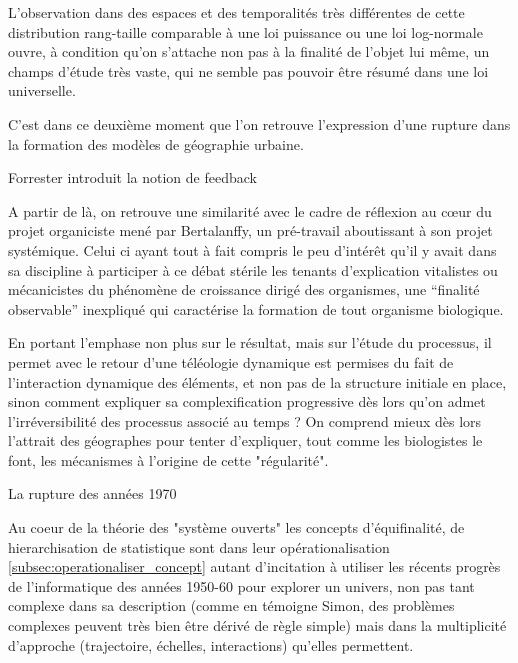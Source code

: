 { 





L'observation dans des espaces et des temporalités très différentes \autocite{Pumain1997} de cette distribution rang-taille comparable à une loi puissance ou une loi log-normale ouvre, à condition qu'on s'attache non pas à la finalité de l'objet lui même, un champs d'étude très vaste, qui ne semble pas pouvoir être résumé dans une loi universelle.



C'est dans ce deuxième moment que l'on retrouve l'expression d'une rupture dans la formation des modèles de géographie urbaine.

Forrester introduit la notion de feedback

A partir de là, on retrouve une similarité avec le cadre de réflexion au cœur du projet organiciste mené par Bertalanffy, un pré-travail aboutissant à son projet systémique. Celui ci ayant tout à fait compris le peu d’intérêt qu'il y avait dans sa discipline à participer à ce débat stérile les tenants d'explication vitalistes ou mécanicistes du phénomène de croissance dirigé des organismes, une \enquote{finalité observable} inexpliqué qui caractérise la formation de tout organisme biologique. 

En portant l'emphase non plus sur le résultat, mais sur l'étude du processus, il permet avec le retour d'une téléologie dynamique est permises du fait de l'interaction dynamique des éléments, et non pas de la structure initiale en place, sinon comment expliquer sa complexification progressive dès lors qu'on admet l'irréversibilité des processus associé au temps ? On comprend mieux dès lors l'attrait des géographes pour tenter d'expliquer, tout comme les biologistes le font, les mécanismes à l'origine de cette "régularité".

La rupture des années 1970 

Au coeur de la théorie des "système ouverts" les concepts d'équifinalité, de hierarchisation de statistique sont dans leur opérationalisation \ref{subsec:operationaliser_concept} autant d'incitation à utiliser les récents progrès de l'informatique des années 1950-60 pour explorer un univers, non pas tant complexe dans sa description (comme en témoigne Simon, des problèmes complexes peuvent très bien être dérivé de règle simple) mais dans la multiplicité d'approche (trajectoire, échelles, interactions) qu'elles permettent.

}
